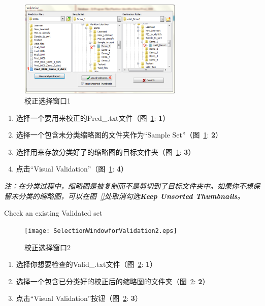\documentclass[12pt]{article}
\begin{document}
\begin{figure}[!ht]
\centering
\includegraphics[width=0.7\textwidth]{SelectionWindowforValidation1.eps}
\caption{校正选择窗口1}
\label{fig: SelectionWindowforValidation1}
\end{figure}

\begin{enumerate}
\item 选择一个要用来校正的Pred\_.txt文件（图~\ref{fig: SelectionWindowforValidation1}: {\color{red}\textbf{1}}）
\item 选择一个包含未分类缩略图的文件夹作为“Sample Set”（图~\ref{fig: SelectionWindowforValidation1}: {\color{red}\textbf{2}}）
\item 选择用来存放分类好了的缩略图的目标文件夹（图~\ref{fig: SelectionWindowforValidation1}: {\color{red}\textbf{3}}）
\item 点击“Visual Validation”（图~\ref{fig: SelectionWindowforValidation1}: {\color{red}\textbf{4}}）
\end{enumerate}

{\color{blue}\textit{注：在分类过程中，缩略图是被复制而不是剪切到了目标文件夹中。如果你不想保留未分类的缩略图，可以在图~\ref{}处取消勾选\textbf{Keep Unsorted Thumbnails}。}}

{\color{red}Check an existing Validated set}

\begin{figure}[!ht]
\centering
\texttt{[image: SelectionWindowforValidation2.eps]}
\caption{校正选择窗口2}
\label{fig: SelectionWindowforValidation2}
\end{figure}

\begin{enumerate}
\item 选择你想要检查的Valid\_.txt文件（图~\ref{fig: SelectionWindowforValidation2}: {\color{red}\textbf{1}}）
\item 选择一个包含已分类好的校正后的缩略图的文件夹（图~\ref{fig: SelectionWindowforValidation2}: {\color{red}\textbf{2}}）
\item 点击“Visual Validation”按钮（图~\ref{fig: SelectionWindowforValidation2}: {\color{red}\textbf{3}}）
\end{enumerate}
\end{document}
